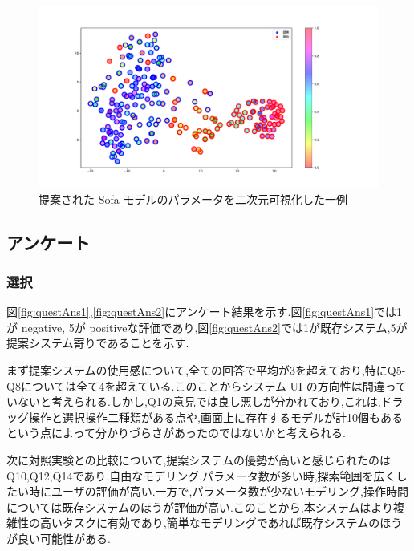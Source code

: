 \begin{figure}[h]
	\begin{center}
		\includegraphics[scale=0.35]{./imgs/tSNE/sofa_5.pdf}
		\caption{提案された Sofa モデルのパラメータを二次元可視化した一例\label{fig:tSNE_example}}
	\end{center}
\end{figure}

\clearpage
\subsection{アンケート}

\subsubsection{選択}
図\ref{fig:questAns1},\ref{fig:questAns2}にアンケート結果を示す.図\ref{fig:questAns1}では1が negative, 5が positiveな評価であり,図\ref{fig:questAns2}では1が既存システム,5が提案システム寄りであることを示す.

まず提案システムの使用感について,全ての回答で平均が3を超えており,特にQ5-Q8については全て4を超えている.このことからシステム UI の方向性は間違っていないと考えられる.しかし,Q1の意見では良し悪しが分かれており,これは,ドラッグ操作と選択操作二種類がある点や,画面上に存在するモデルが計10個もあるという点によって分かりづらさがあったのではないかと考えられる.

次に対照実験との比較について,提案システムの優勢が高いと感じられたのはQ10,Q12,Q14であり,自由なモデリング,パラメータ数が多い時,探索範囲を広くしたい時にユーザの評価が高い.一方で,パラメータ数が少ないモデリング,操作時間については既存システムのほうが評価が高い.このことから,本システムはより複雑性の高いタスクに有効であり,簡単なモデリングであれば既存システムのほうが良い可能性がある.


